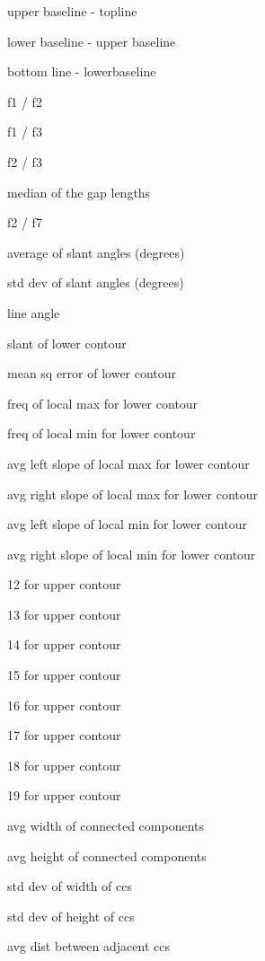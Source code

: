 \documentclass[paper=a4, fontsize=11pt]{scrartcl} %
\numberwithin{equation}{section} %
\numberwithin{figure}{section} %
\numberwithin{table}{section} %
\begin{document}
\begin{figure}
\label{fig:featureList}
\begin{multicols}{3}
\begin{enumerate*}
\item upper baseline - topline 				
\item lower baseline - upper baseline 			
\item bottom line - lowerbaseline 			
\item f1 / f2 							
\item f1 / f3 							
\item f2 / f3 							
\item median of the gap lengths 				
\item f2 / f7 							
\item average of slant angles (degrees) 			
\item std dev of slant angles (degrees) 			
\item line angle 						
\item slant of lower contour				
\item mean sq error of lower contour			
\item freq of local max for lower contour			
\item freq of local min for lower contour			
\item avg left slope of local max for lower contour	
\item avg right slope of local max  for lower contour	
\item avg left slope of local min for lower contour	
\item avg right slope of local min for lower contour  	
\item 12 for upper contour					
\item 13 for upper contour					
\item 14 for upper contour					
\item 15 for upper contour					
\item 16 for upper contour					
\item 17 for upper contour					
\item 18 for upper contour					
\item 19 for upper contour					
\item avg width of connected components		
\item avg height of connected components		
\item std dev of width of ccs				
\item std dev of height of ccs				
\item avg dist between adjacent ccs			

\end{enumerate*}
\end{multicols}
\end{figure}
\end{document}
